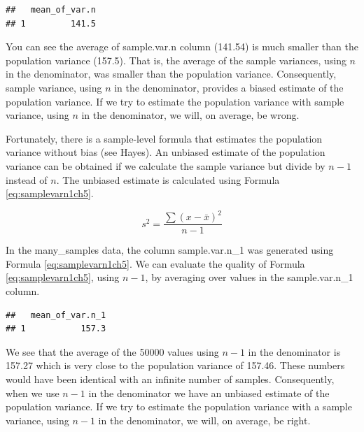\documentclass[
]{krantz}
\makeatletter
\newenvironment{Shaded}{\begin{snugshade}}{\end{snugshade}}
\newcommand{\DataTypeTok}[1]{\textcolor[rgb]{0.27,0.27,0.27}{#1}}
\newcommand{\DecValTok}[1]{\textcolor[rgb]{0.06,0.06,0.06}{#1}}
\newcommand{\KeywordTok}[1]{\textcolor[rgb]{0.27,0.27,0.27}{\textbf{#1}}}
\newcommand{\NormalTok}[1]{#1}
\newcommand{\OperatorTok}[1]{\textcolor[rgb]{0.43,0.43,0.43}{\textbf{#1}}}
\newcommand{\StringTok}[1]{\textcolor[rgb]{0.5,0.5,0.5}{#1}}
\newenvironment{kframe}{%
\medskip{}
\setlength{\fboxsep}{.8em}
 \def\at@end@of@kframe{}%
 \ifinner\ifhmode%
  \def\at@end@of@kframe{\end{minipage}}%
  \begin{minipage}{\columnwidth}%
 \fi\fi%
 \def\FrameCommand##1{\hskip\@totalleftmargin \hskip-\fboxsep
 \colorbox{shadecolor}{##1}\hskip-\fboxsep
     \hskip-\linewidth \hskip-\@totalleftmargin \hskip\columnwidth}%
 \MakeFramed {\advance\hsize-\width
   \@totalleftmargin\z@ \linewidth\hsize
   \@setminipage}}%
 {\par\unskip\endMakeFramed%
 \at@end@of@kframe}
\renewenvironment{Shaded}{\begin{kframe}}{\end{kframe}}
\makeatother
\begin{document}
\begin{verbatim}
##   mean_of_var.n
## 1         141.5
\end{verbatim}

You can see the average of sample.var.n column (141.54) is much smaller than the population variance (157.5). That is, the average of the sample variances, using \(n\) in the denominator, was smaller than the population variance. Consequently, sample variance, using \(n\) in the denominator, provides a biased estimate of the population variance. If we try to estimate the population variance with sample variance, using \(n\) in the denominator, we will, on average, be wrong.

Fortunately, there is a sample-level formula that estimates the population variance without bias (see Hayes). An unbiased estimate of the population variance can be obtained if we calculate the sample variance but divide by \(n - 1\) instead of \(n\). The unbiased estimate is calculated using Formula \eqref{eq:samplevarn1ch5}.

\begin{equation} 
s^2 = \frac{\sum{(x - \bar{x})^2}}{n-1}
      \label{eq:samplevarn1ch5}
\end{equation}

In the many\_samples data, the column sample.var.n\_1 was generated using Formula \eqref{eq:samplevarn1ch5}. We can evaluate the quality of Formula \eqref{eq:samplevarn1ch5}, using \(n-1\), by averaging over values in the sample.var.n\_1 column.

\begin{Shaded}
\end{Shaded}

\begin{verbatim}
##   mean_of_var.n_1
## 1           157.3
\end{verbatim}

We see that the average of the 50000 values using \(n-1\) in the denominator is 157.27 which is very close to the population variance of 157.46. These numbers would have been identical with an infinite number of samples. Consequently, when we use \(n-1\) in the denominator we have an unbiased estimate of the population variance. If we try to estimate the population variance with a sample variance, using \(n-1\) in the denominator, we will, on average, be right.
\end{document}
